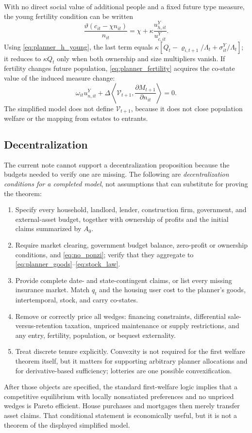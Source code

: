\documentclass[11pt]{article}
\newcommand{\1}{\mathbf 1}
\begin{document}
With no direct social value of additional people and a fixed future type
measure, the young fertility condition can be written
\begin{equation}
\boxed{
\frac{\vartheta(c_{it}-\chi n_{it})}{n_{it}}
=\chi+\kappa\frac{u_{h,it}^Y}{u_{c,it}^Y}.}
\label{eq:planner_fertility}
\end{equation}
Using \eqref{eq:planner_h_young}, the last term equals
$\kappa[Q_t-\varrho_{i,t+1}/\Lambda_t+
\sigma_{it}^Y/\Lambda_t]$; it reduces to $\kappa Q_t$ only when both
ownership and size multipliers vanish.
If fertility changes future population, \eqref{eq:planner_fertility} acquires
the co-state value of the induced measure change:
\begin{equation}
\omega_{it}u_{n,it}^Y
+\Delta\left\langle \mathcal V_{t+1},
\frac{\partial M_{t+1}}{\partial n_{it}}\right\rangle=0.
\label{eq:fertility_costate}
\end{equation}
The simplified model does not define $\mathcal V_{t+1}$, because it does not
close population welfare or the mapping from estates to entrants.

\subsection{Decentralization}

The current note cannot support a decentralization proposition because the
budgets needed to verify one are missing. The following are
\emph{decentralization conditions for a completed model}, not assumptions that
can substitute for proving the theorem:
\begin{enumerate}
\item Specify every household, landlord, lender, construction firm,
government, and external-asset budget, together with ownership of profits and
the initial claims summarized by $A_0$.
\item Require market clearing, government budget balance, zero-profit or
ownership conditions, and \eqref{eq:no_ponzi}; verify that they aggregate to
\eqref{eq:planner_goods}--\eqref{eq:stock_law}.
\item Provide complete date- and state-contingent claims, or list every missing
insurance market. Match $q_t$ and the housing user cost to the planner's goods,
intertemporal, stock, and carry co-states.
\item Remove or correctly price all wedges: financing constraints, differential
sale-versus-retention taxation, unpriced maintenance or supply restrictions,
and any entry, fertility, population, or bequest externality.
\item Treat discrete tenure explicitly. Convexity is not required for the
first welfare theorem itself, but it matters for supporting arbitrary planner
allocations and for derivative-based sufficiency; lotteries are one possible
convexification.
\end{enumerate}
After those objects are specified, the standard first-welfare logic implies
that a competitive equilibrium with locally nonsatiated preferences and no
unpriced wedges is Pareto efficient. House purchases and mortgages then merely
transfer asset claims. That conditional statement is economically useful, but
it is not a theorem of the displayed simplified model.
\end{document}

